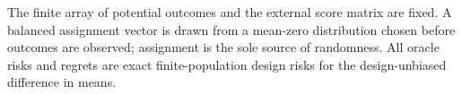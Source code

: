The finite array of potential outcomes and the external score matrix are fixed.  A balanced assignment vector is drawn from a mean-zero distribution chosen before outcomes are observed; assignment is the sole source of randomness.  All oracle risks and regrets are exact finite-population design risks for the design-unbiased difference in means.
